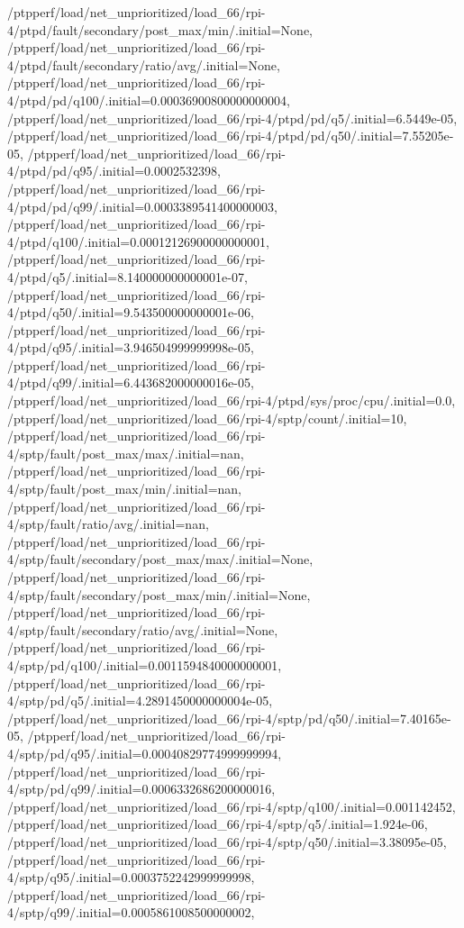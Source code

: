 {    /ptpperf/load/net_unprioritized/load_66/rpi-4/ptpd/fault/secondary/post_max/min/.initial=None,
    /ptpperf/load/net_unprioritized/load_66/rpi-4/ptpd/fault/secondary/ratio/avg/.initial=None,
    /ptpperf/load/net_unprioritized/load_66/rpi-4/ptpd/pd/q100/.initial=0.00036900800000000004,
    /ptpperf/load/net_unprioritized/load_66/rpi-4/ptpd/pd/q5/.initial=6.5449e-05,
    /ptpperf/load/net_unprioritized/load_66/rpi-4/ptpd/pd/q50/.initial=7.55205e-05,
    /ptpperf/load/net_unprioritized/load_66/rpi-4/ptpd/pd/q95/.initial=0.0002532398,
    /ptpperf/load/net_unprioritized/load_66/rpi-4/ptpd/pd/q99/.initial=0.0003389541400000003,
    /ptpperf/load/net_unprioritized/load_66/rpi-4/ptpd/q100/.initial=0.00012126900000000001,
    /ptpperf/load/net_unprioritized/load_66/rpi-4/ptpd/q5/.initial=8.140000000000001e-07,
    /ptpperf/load/net_unprioritized/load_66/rpi-4/ptpd/q50/.initial=9.543500000000001e-06,
    /ptpperf/load/net_unprioritized/load_66/rpi-4/ptpd/q95/.initial=3.946504999999998e-05,
    /ptpperf/load/net_unprioritized/load_66/rpi-4/ptpd/q99/.initial=6.443682000000016e-05,
    /ptpperf/load/net_unprioritized/load_66/rpi-4/ptpd/sys/proc/cpu/.initial=0.0,
    /ptpperf/load/net_unprioritized/load_66/rpi-4/sptp/count/.initial=10,
    /ptpperf/load/net_unprioritized/load_66/rpi-4/sptp/fault/post_max/max/.initial=nan,
    /ptpperf/load/net_unprioritized/load_66/rpi-4/sptp/fault/post_max/min/.initial=nan,
    /ptpperf/load/net_unprioritized/load_66/rpi-4/sptp/fault/ratio/avg/.initial=nan,
    /ptpperf/load/net_unprioritized/load_66/rpi-4/sptp/fault/secondary/post_max/max/.initial=None,
    /ptpperf/load/net_unprioritized/load_66/rpi-4/sptp/fault/secondary/post_max/min/.initial=None,
    /ptpperf/load/net_unprioritized/load_66/rpi-4/sptp/fault/secondary/ratio/avg/.initial=None,
    /ptpperf/load/net_unprioritized/load_66/rpi-4/sptp/pd/q100/.initial=0.0011594840000000001,
    /ptpperf/load/net_unprioritized/load_66/rpi-4/sptp/pd/q5/.initial=4.2891450000000004e-05,
    /ptpperf/load/net_unprioritized/load_66/rpi-4/sptp/pd/q50/.initial=7.40165e-05,
    /ptpperf/load/net_unprioritized/load_66/rpi-4/sptp/pd/q95/.initial=0.00040829774999999994,
    /ptpperf/load/net_unprioritized/load_66/rpi-4/sptp/pd/q99/.initial=0.0006332686200000016,
    /ptpperf/load/net_unprioritized/load_66/rpi-4/sptp/q100/.initial=0.001142452,
    /ptpperf/load/net_unprioritized/load_66/rpi-4/sptp/q5/.initial=1.924e-06,
    /ptpperf/load/net_unprioritized/load_66/rpi-4/sptp/q50/.initial=3.38095e-05,
    /ptpperf/load/net_unprioritized/load_66/rpi-4/sptp/q95/.initial=0.0003752242999999998,
    /ptpperf/load/net_unprioritized/load_66/rpi-4/sptp/q99/.initial=0.0005861008500000002,
}
